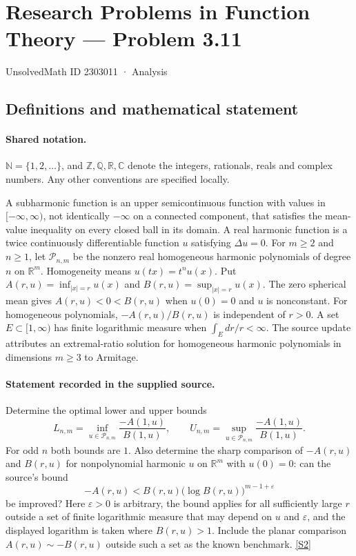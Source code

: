 \documentclass[11pt]{article}
\newcommand{\sref}[2]{\hyperlink{source:#1:#2}{[S#2]}}
\begin{document}
\setcounter{section}{2303010}
\section{Research Problems in Function Theory — Problem 3.11}\label{2303011}
{\small\sffamily UnsolvedMath ID 2303011 · Analysis}
\subsection{Definitions and mathematical statement}

\paragraph{Shared notation.}$\mathbb N=\{1,2,\ldots\}$, and $\mathbb Z,\mathbb Q,\mathbb R,\mathbb C$ denote the integers, rationals, reals and complex numbers. Any other conventions are specified locally.


A subharmonic function is an upper semicontinuous function with values in $[-\infty,\infty)$, not identically $-\infty$ on a connected component, that satisfies the mean-value inequality on every closed ball in its domain. A real harmonic function is a twice continuously differentiable function $u$ satisfying $\Delta u=0$. For $m\geq2$ and $n\geq1$, let $\mathcal P_{n,m}$ be the nonzero real homogeneous harmonic polynomials of degree $n$ on $\mathbb R^m$. Homogeneity means $u(tx)=t^n u(x)$. Put $A(r,u)=\inf_{|x|=r}u(x)$ and $B(r,u)=\sup_{|x|=r}u(x)$. The zero spherical mean gives $A(r,u)<0<B(r,u)$ when $u(0)=0$ and $u$ is nonconstant. For homogeneous polynomials, $-A(r,u)/B(r,u)$ is independent of $r>0$. A set $E\subset[1,\infty)$ has finite logarithmic measure when $\int_E dr/r<\infty$.
The source update attributes an extremal-ratio solution for homogeneous harmonic polynomials in dimensions $m\geq3$ to Armitage.
\paragraph{Statement recorded in the supplied source.}
Determine the optimal lower and upper bounds
\[L_{n,m}=\inf_{u\in\mathcal P_{n,m}}\frac{-A(1,u)}{B(1,u)},\qquad
U_{n,m}=\sup_{u\in\mathcal P_{n,m}}\frac{-A(1,u)}{B(1,u)}.\]
For odd $n$ both bounds are $1$. Also determine the sharp comparison of $-A(r,u)$ and $B(r,u)$ for nonpolynomial harmonic $u$ on $\mathbb R^m$ with $u(0)=0$: can the source's bound
\[-A(r,u)<B(r,u)\bigl(\log B(r,u)\bigr)^{m-1+\varepsilon}\]
be improved? Here $\varepsilon>0$ is arbitrary, the bound applies for all sufficiently large $r$ outside a set of finite logarithmic measure that may depend on $u$ and $\varepsilon$, and the displayed logarithm is taken where $B(r,u)>1$. Include the planar comparison $A(r,u)\sim-B(r,u)$ outside such a set as the known benchmark. \sref{2303011}{2}
\end{document}
